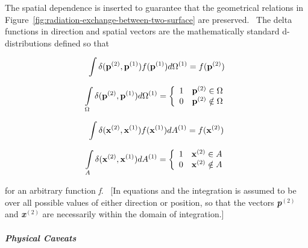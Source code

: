 The spatial dependence is inserted to guarantee that the geometrical relations in Figure~\ref{fig:radiation-exchange-between-two-surface} are preserved.~ The delta functions in direction and spatial vectors are the mathematically standard d-distributions defined so that

\begin{equation}
\int {\delta ({{\bf{p}}^{{\rm{(2)}}}},{{\bf{p}}^{{\rm{(1)}}}})} f({{\bf{p}}^{{\rm{(1)}}}})d{\Omega ^{{\rm{(1)}}}} = f({{\bf{p}}^{{\rm{(2)}}}})
\end{equation}

\begin{equation}
\int\limits_\Omega  {\delta ({{\bf{p}}^{{\rm{(2)}}}},{{\bf{p}}^{{\rm{(1)}}}})d{\Omega ^{{\rm{(1)}}}}}  = \left\{ {\begin{array}{*{20}{c}}1&{{{\bf{p}}^{{\rm{(2)}}}} \in \Omega }\\0&{{{\bf{p}}^{{\rm{(2)}}}} \notin \Omega }\end{array}} \right.
\end{equation}

\begin{equation}
\int {\delta ({{\bf{x}}^{{\rm{(2)}}}},{{\bf{x}}^{{\rm{(1)}}}})} f({{\bf{x}}^{{\rm{(1)}}}})d{A^{{\rm{(1)}}}} = f({{\bf{x}}^{{\rm{(2)}}}})
\end{equation}

\begin{equation}
\int\limits_A {\delta ({{\bf{x}}^{{\rm{(2)}}}},{{\bf{x}}^{{\rm{(1)}}}})d{A^{{\rm{(1)}}}}}  = \left\{ {\begin{array}{*{20}{c}}1&{{{\bf{x}}^{{\rm{(2)}}}} \in A}\\0&{{{\bf{x}}^{{\rm{(2)}}}} \notin A}\end{array}} \right.
\end{equation}

for an arbitrary function \emph{f}.~ {[}In equations and the integration is assumed to be over all possible values of either direction or position, so that the vectors \textbf{\emph{p}}\(^{(2)}\) and \textbf{\emph{x}}\(^{(2)}\) are necessarily within the domain of integration.{]}

\subparagraph{Physical Caveats}\label{physical-caveats}

